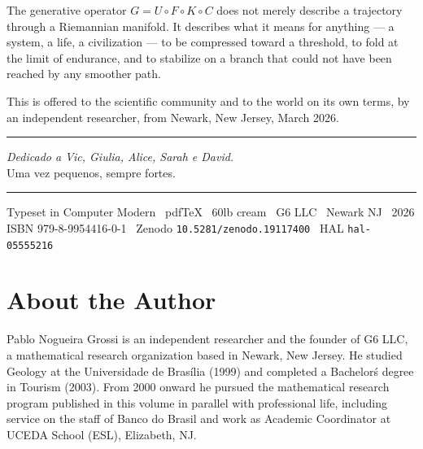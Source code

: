 \documentclass[12pt, oneside]{book}
\theoremstyle{plain}
\theoremstyle{definition}
\theoremstyle{remark}
\begin{document}
\vspace{0.3cm}

\noindent The generative operator $G = U \circ F \circ K \circ C$ does not merely
describe a trajectory through a Riemannian manifold. It describes
what it means for anything --- a system, a life, a civilization ---
to be compressed toward a threshold, to fold at the limit of
endurance, and to stabilize on a branch that could not have been
reached by any smoother path.

\vspace{0.3cm}

\noindent This is offered to the scientific community and to the world
on its own terms, by an independent researcher,
from Newark, New Jersey, March 2026.

\vspace{0.8cm}

\begin{center}
\rule{0.5\textwidth}{0.4pt}

\vspace{0.4cm}

\textit{Dedicado a Vic, Giulia, Alice, Sarah e David.}\\[0.3em]
{\small Uma vez pequenos, sempre fortes.}

\vspace{0.4cm}

\rule{0.5\textwidth}{0.2pt}

\vspace{0.3cm}

{\scriptsize\color{gray}
Typeset in Computer Modern \textperiodcentered\ pdfTeX \textperiodcentered\
60lb cream \textperiodcentered\ G6 LLC \textperiodcentered\ Newark NJ \textperiodcentered\ 2026\\
ISBN 979-8-9954416-0-1 \textperiodcentered\ Zenodo \texttt{10.5281/zenodo.19117400}
\textperiodcentered\ HAL \texttt{hal-05555216}}
\end{center}

\backmatter

\chapter*{About the Author}

Pablo Nogueira Grossi is an independent researcher and the founder of G6 LLC,
a mathematical research organization based in Newark, New Jersey. He studied
Geology at the Universidade de Bras\'ilia (1999) and completed a Bachelor\'s
degree in Tourism (2003). From 2000 onward he pursued the mathematical research
program published in this volume in parallel with professional life, including
service on the staff of Banco do Brasil and work as Academic Coordinator at
UCEDA School (ESL), Elizabeth, NJ.
\end{document}
